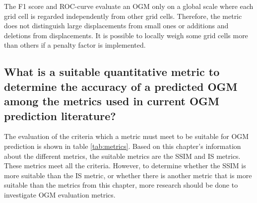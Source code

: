 The F1 score and \gls{ROC}-curve evaluate an \gls{OGM} only on a global scale where each grid cell is regarded independently from other grid cells. Therefore, the metric does not distinguish large displacements from small ones or additions and deletions from displacements. It is possible to locally weigh some grid cells more than others if a penalty factor is implemented.



\subsection{What is a suitable quantitative metric to determine the accuracy of a predicted \gls{OGM} among the metrics used in current \gls{OGM} prediction literature?} \label{subsec:con_met}

The evaluation of the criteria which a metric must meet to be suitable for \gls{OGM} prediction is shown in table \ref{tab:metrics}. Based on this chapter's information about the different metrics, the suitable metrics are the \gls{SSIM} and \gls{IS} metrics. These metrics meet all the criteria. However, to determine whether the \gls{SSIM} is more suitable than the \gls{IS} metric, or whether there is another metric that is more suitable than the metrics from this chapter, more research should be done to investigate \gls{OGM} evaluation metrics. 

